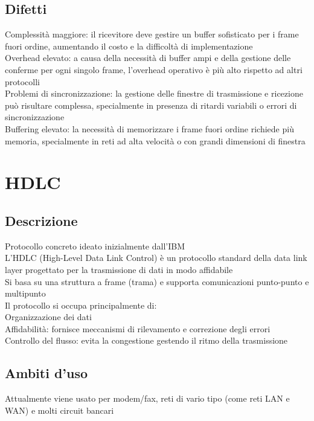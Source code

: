 \documentclass[10pt,oneside,a4paper]{article}
\begin{document}
\subsection{Difetti}
Complessità maggiore: il ricevitore deve gestire un buffer sofisticato per i frame fuori ordine, aumentando il costo e la difficoltà di implementazione\\
Overhead elevato: a causa della necessità di buffer ampi e della gestione delle conferme per ogni singolo frame, l'overhead operativo è più alto rispetto ad altri protocolli\\
Problemi di sincronizzazione: la gestione delle finestre di trasmissione e ricezione può risultare complessa, specialmente in presenza di ritardi variabili o errori di sincronizzazione\\
Buffering elevato: la necessità di memorizzare i frame fuori ordine richiede più memoria, specialmente in reti ad alta velocità o con grandi dimensioni di finestra
\section{HDLC}
\subsection{Descrizione}
Protocollo concreto ideato inizialmente dall'IBM\\
L'HDLC (High-Level Data Link Control) è un protocollo standard della data link layer progettato per la trasmissione di dati in modo affidabile\\
Si basa su una struttura a frame (trama) e supporta comunicazioni punto-punto e multipunto\\
Il protocollo si occupa principalmente di:\\
Organizzazione dei dati\\
Affidabilità: fornisce meccanismi di rilevamento e correzione degli errori\\
Controllo del flusso: evita la congestione gestendo il ritmo della trasmissione
\subsection{Ambiti d'uso}
Attualmente viene usato per modem/fax, reti di vario tipo (come reti LAN  e WAN) e molti circuit bancari
\end{document}

